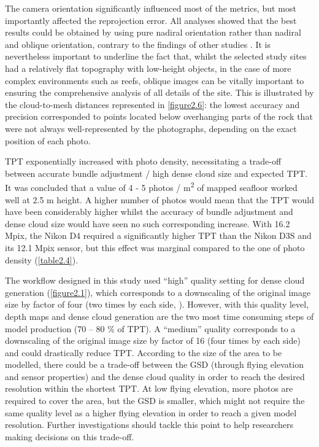 The camera orientation significantly influenced most of the metrics, but most importantly affected the reprojection error. All analyses showed that the best results could be obtained by using pure nadiral orientation rather than nadiral and oblique orientation, contrary to the findings of other studies \citep{chiabrando_influence_2017}. It is nevertheless important to underline the fact that, whilst the selected study sites had a relatively flat topography with low-height objects, in the case of more complex environments such as reefs, oblique images can be vitally important to ensuring the comprehensive analysis of all details of the site. This is illustrated by the cloud-to-mesh distances represented in \autoref{figure2.6}: the lowest accuracy and precision corresponded to points located below overhanging parts of the rock that were not always well-represented by the photographs, depending on the exact position of each photo.

TPT exponentially increased with photo density, necessitating a trade-off between accurate bundle adjustment / high dense cloud size and expected TPT. It was concluded that a value of 4 - 5 photos / m\textsuperscript{2} of mapped seafloor worked well at 2.5 m height. A higher number of photos would mean that the TPT would have been considerably higher whilst the accuracy of bundle adjustment and dense cloud size would have seen no such corresponding increase. With 16.2 Mpix, the Nikon D4 required a significantly higher TPT than the Nikon D3S and its 12.1 Mpix sensor, but this effect was marginal compared to the one of photo density (\autoref{table2.4}).

The workflow designed in this study used “high” quality setting for dense cloud generation (\autoref{figure2.1}), which corresponds to a downscaling of the original image size by factor of four (two times by each side, \citep{agisoft_agisoft_2018-1}). However, with this quality level, depth maps and dense cloud generation are the two most time consuming steps of model production (70 – 80 \% of TPT). A “medium” quality corresponds to a downscaling of the original image size by factor of 16 (four times by each side) and could drastically reduce TPT. According to the size of the area to be modelled, there could be a trade-off between the GSD (through flying elevation and sensor properties) and the dense cloud quality in order to reach the desired resolution within the shortest TPT. At low flying elevation, more photos are required to cover the area, but the GSD is smaller, which might not require the same quality level as a higher flying elevation in order to reach a given model resolution. Further investigations should tackle this point to help researchers making decisions on this trade-off.

